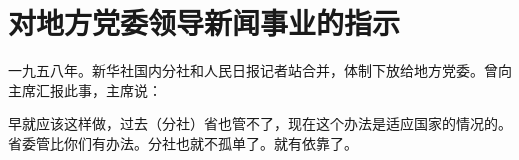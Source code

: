 \section[对地方党委领导新闻事业的指示（一九五八年）]{对地方党委领导新闻事业的指示}


一九五八年。新华社国内分社和人民日报记者站合并，体制下放给地方党委。曾向主席汇报此事，主席说：

早就应该这样做，过去（分社）省也管不了，现在这个办法是适应国家的情况的。省委管比你们有办法。分社也就不孤单了。就有依靠了。



